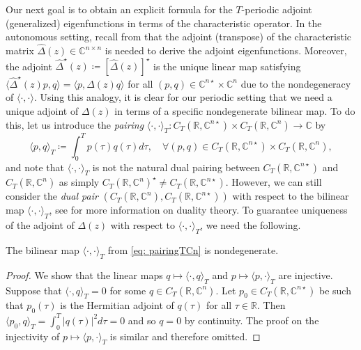 \documentclass[english]{myarticle}
\begin{document}
\begin{sloppypar}
Our next goal is to obtain an explicit formula for the $T$-periodic adjoint (generalized) eigenfunctions in terms of the characteristic operator. In the autonomous setting, recall from \cite{Diekmann1995,Bosschaert2020,Janssens2010} that the adjoint (transpose) of the characteristic matrix $\hat{\Delta}(z) \in \mathbb{C}^{n \times n}$ is needed to derive the adjoint eigenfunctions. Moreover, the adjoint $\hat{\Delta}^\star(z) \coloneqq [\hat{\Delta}(z)]^\star$ is the unique linear map satisfying $\langle \hat{\Delta}^\star(z)p,q \rangle = \langle p, \hat{\Delta}(z)q \rangle$ for all $(p,q) \in \mathbb{C}^{n \star} \times \mathbb{C}^{n}$ due to the nondegeneracy of $\langle \cdot , \cdot \rangle$. Using this analogy, it is clear for our periodic setting that we need a unique adjoint of $\Delta(z)$ in terms of a specific nondegenerate bilinear map. To do this, let us introduce the \emph{pairing} $\langle \cdot, \cdot \rangle_T : C_T(\mathbb{R},\mathbb{C}^{n \star}) \times C_T(\mathbb{R},\mathbb{C}^n) \to \mathbb{C}$ by
\begin{equation} \label{eq: pairingTCn}
    \langle p,q \rangle_T \coloneqq \int_0^T  p(\tau)q(\tau) d \tau, \quad \forall (p,q) \in C_T(\mathbb{R},\mathbb{C}^{n \star}) \times C_T(\mathbb{R},\mathbb{C}^n),
\end{equation}
and note that $\langle \cdot, \cdot \rangle_T$ is not the natural dual pairing between $C_T(\mathbb{R},\mathbb{C}^{n \star})$ and $C_T(\mathbb{R},\mathbb{C}^n)$ as simply $C_T(\mathbb{R},\mathbb{C}^n)^\star \neq C_T(\mathbb{R},\mathbb{C}^{n \star})$. However, we can still consider the \emph{dual pair} $(C_T(\mathbb{R},\mathbb{C}^n),C_T(\mathbb{R},\mathbb{C}^{n \star}))$ with respect to the bilinear map $\langle \cdot , \cdot \rangle_T$, see \cite[Chapter 8]{Narici2010} for more information on duality theory. To guarantee uniqueness of the adjoint of $\Delta(z)$ with respect to $\langle \cdot , \cdot \rangle_T$, we need the following.

\begin{lemma} \label{lemma:nondegenerate}
The bilinear map $\langle \cdot, \cdot \rangle_T$ from \eqref{eq: pairingTCn} is nondegenerate.
\end{lemma}
\begin{proof}
We show that the linear maps $q \mapsto \langle \cdot,q \rangle_T$ and $p \mapsto \langle p, \cdot \rangle_T$ are injective. Suppose that $\langle \cdot,q \rangle_T = 0$ for some $q \in C_T(\mathbb{R},\mathbb{C}^n)$. Let $p_0 \in C_T(\mathbb{R},\mathbb{C}^{n \star})$ be such that $p_0(\tau)$ is the Hermitian adjoint of $q(\tau)$ for all $\tau \in \mathbb{R}$. Then $\langle p_0,q \rangle_T = \int_0^T |q(\tau)|^2 d\tau = 0$ and so $q=0$ by continuity. The proof on the injectivity of $p \mapsto \langle p, \cdot \rangle_T$ is similar and therefore omitted.
\end{proof}


\end{sloppypar}
\end{document}
